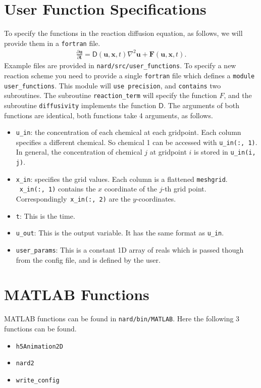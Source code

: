 \documentclass[11pt]{article}
\begin{document}
    \section[User Function Specifications]{User Function Specifications}
    To specify the functions in the reaction diffusion equation, as follows, we will provide them in a \texttt{fortran} file.
    \begin{gather}
        \frac{\partial \mathbf{u} }{\partial \mathbf{t}} = \mathsf{D}(\mathbf{u}, \mathbf{x}, t)\nabla^2 \mathbf{u} + \mathbf{F}(\mathbf{u}, \mathbf{x}, t).
    \end{gather}
    Example files are provided in \texttt{nard/src/user\_functions}.
    To specify a new reaction scheme you need to provide a single \texttt{fortran} file which defines a \texttt{module user\_functions}.
    This module will \texttt{use precision}, and \texttt{contains} two subroutines.
    The subroutine \texttt{reaction\_term} will specify the function \(F\), and the subroutine \texttt{diffusivity} implements the function \(\mathsf{D}\).
    The arguments of both functions are identical, both functions take 4 arguments, as follows.
    \begin{itemize}
        \item \texttt{u\_in}: the concentration of each chemical at each gridpoint.
        Each column specifies a different chemical.
        So chemical 1 can be accessed with \texttt{u\_in(:, 1)}.
        In general, the concentration of chemical \(j\) at gridpoint \(i\) is stored in \texttt{u\_in(i, j)}.
        \item \texttt{x\_in}: specifies the grid values. Each column is a flattened \texttt{meshgrid}.
        ~\texttt{x\_in(:, 1)} contains the \(x\) coordinate of the \(j\)-th grid point.
        Correspondingly~\texttt{x\_in(:, 2)} are the \(y\)-coordinates.
        \item \texttt{t}: This is the time.
        \item \texttt{u\_out}: This is the output variable. It has the same format as \texttt{u\_in}.
        \item \texttt{user\_params}: This is a constant 1D array of reals which is passed though from the config file, and is defined by the user.
    \end{itemize}


    \section[MATLAB Functions]{MATLAB Functions}
    MATLAB functions can be found in \texttt{nard/bin/MATLAB}.
    Here the following 3 functions can be found.
    \begin{itemize}
        \item \texttt{h5Animation2D}
        \item \texttt{nard2}
        \item \texttt{write\_config}
    \end{itemize}
    
\end{document}
